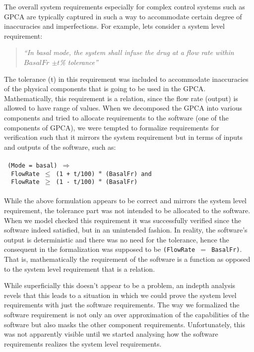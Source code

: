 The overall system requirements especially for complex control systems such as GPCA are typically captured in such a way to accommodate certain degree of inaccuracies and imperfections. For example, lets consider a system level requirement:

\begin{quotation}
\emph{``In basal mode, the system shall infuse the drug at a flow rate within $BasalFr$ $\pm t$\% tolerance''}
\end{quotation}

The tolerance (t) in this requirement was included to accommodate inaccuracies of the physical components that is going to be used in the GPCA. Mathematically, this requirement is a relation, since the flow rate (output) is allowed to have range of values. When we decomposed the GPCA into various components and tried to allocate requirements to the software (one of the components of GPCA), we were tempted to formalize requirements for verification such that it mirrors the system requirement but in terms of inputs and outputs of the software, such as:
\\\\
\footnotesize{\texttt{
(Mode = basal) $\Rightarrow$\\
\textcolor{white}{------}FlowRate $\leq$ (1 + t/100) $\ast$ (BasalFr) and \\
\textcolor{white}{------}FlowRate $\geq$ (1 - t/100) $\ast$ (BasalFr)\\
}}
\normalsize{}\\
While the above formulation appears to be correct and mirrors the system level requirement, the tolerance part was not intended to be allocated to the software. When we model checked this requirement it was successfully verified since the software indeed satisfied, but in an unintended fashion. In reality, the software's output is deterministic and there was no need for the tolerance, hence the consequent in the formalization was supposed to be \texttt{(FlowRate $=$ BasalFr)}. That is, mathematically the requirement of the software is a function as opposed to the system level requirement that is a relation. %

While superficially this doesn't appear to be a problem, an indepth analysis revels that this leads to a situation in which we could prove the system level requirements with just the software requirements. The way we formalized the software requirement is not only an over approximation of the capabilities of the software but also masks the other component requirements. Unfortunately, this was not apparently visible until we started analysing how the software requirements realizes the system level requirements.
